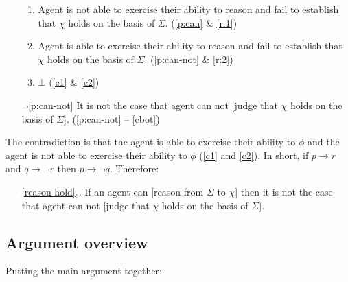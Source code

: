 \documentclass[10pt]{article}
\newcommand{\hozlinedash}[0]{%
  \noindent\hdashrule[0.5ex][c]{\textwidth}{.1pt}{2.5pt}
}
\begin{document}
\begin{enumerate}
\begin{enumerate}[ref=\alph*.]
  \item\label{c1} Agent is not able to exercise their ability to reason and fail to establish that \(\chi\) holds on the basis of \(\Sigma\). \hfill (\ref{p:can} \& \ref{r:1})
  \item\label{c2} Agent is able to exercise their ability to reason and fail to establish that \(\chi\) holds on the basis of \(\Sigma\). \hfill (\ref{p:can-not} \& \ref{r:2})
  \item\label{cbot} \(\bot\) (\ref{c1} \& \ref{c2})
  \end{enumerate}
\item[\(\lnot\)\ref{p:can-not}] It is not the case that agent can not [judge that \(\chi\) holds on the basis of \(\Sigma\)]. \hfill (\ref{p:can-not} -- \ref{cbot})
\end{enumerate}

The contradiction is that the agent is able to exercise their ability to \(\phi\) and the agent is not able to exercise their ability to \(\phi\) (\ref{c1} and \ref{c2}).
In short, if \(p \rightarrow r\) and \(q \rightarrow \lnot r\) then \(p \rightarrow \lnot q\).
Therefore:

\begin{itemize}
\item[\ref{reason-hold}\(_{c}\).] If an agent can [reason from \(\Sigma\) to \(\chi\)] then it is not the case that agent can not [judge that \(\chi\) holds on the basis of \(\Sigma\)].
\end{itemize}

\hozlinedash

\newpage

\subsection{Argument overview}
\label{sec:argument-overview}

Putting the main argument together:
\end{document}
